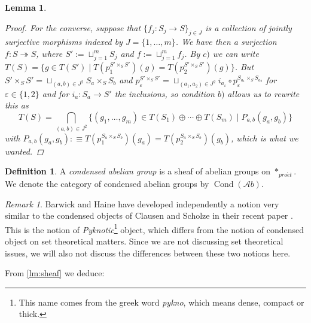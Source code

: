 \documentclass[11pt,A4]{article}
\theoremstyle{plain}
\newtheorem{lm}[thm]{Lemma}
\theoremstyle{definition}
\newtheorem{defn}[thm]{Definition}
\theoremstyle{remark}
\newtheorem{rem}[thm]{Remark}
\newcommand{\1}{\mathbbm{1}}
\newcommand{\Ab}{\mathscr{A}b}
\DeclareMathOperator{\Cond}{Cond}
\newcommand{\pe}{*_{pro\acute et}}
\newcommand{\op}{\oplus}
\newcommand{\fp}[1]{\times_{#1}}
\begin{document}
\begin{lm}
\begin{proof}
	For the converse, suppose that $\{f_{j}\colon S_{j}\to S\}_{j\in J}$ is a collection of jointly surjective morphisms indexed by $J=\{ 1,\ldots,m\}$.
	We have then a surjection $f\colon S \twoheadrightarrow S$, where $S':=\sqcup_{j=1}^{m}S_{j}$ and $f:=\sqcup_{j=1}^{m}f_{j}$.
	By $c)$ we can write $T(S)=\{ g\in T(S')\mid T(p_{1}^{S'\fp{S}S'})(g)=T(p_{2}^{S'\fp{S}S'})(g)\}$.
	But $S'\fp{S}S'=\sqcup_{(a,b)\in J^{2}} S_{a}\fp{S}S_{b}$ and $p_{\varepsilon }^{S'\fp{S}S'}=\sqcup_{(a_{1},a_{2})\in J^{2}} i_{a_{\varepsilon}}\circ p_{\varepsilon }^{S_{a_{1}}\fp{S}S_{a_{2}}}$ for $\varepsilon \in \{1,2\}$ and for $i_{a}\colon S_{a}\to S'$ the inclusions, so condition $b)$ allows us to rewrite this as
	\[ T(S)=\bigcap_{(a,b)\in J^{2}} \{ (g_{1},\ldots,g_{m})\in T(S_{1})\op \cdots \op T(S_{m})\mid P_{a,b}(g_{a},g_{b})\}\]
	with $P_{a,b}(g_{a},g_{b}):\equiv T(p_{1}^{S_{a}\fp{S}S_{b}})(g_{a})=T(p_{2}^{S_{a}\fp{S}S_{b}})(g_{b})$, which is what we wanted.	
    \end{proof}
\end{lm}

\begin{defn}
    A \textit{condensed abelian group} is a sheaf of abelian groups on $\pe$.
    We denote the category of condensed abelian groups by $\Cond(\Ab)$.
\end{defn}

\begin{rem}
    Barwick and Haine have developed independently a notion very similar to the condensed objects of Clausen and Scholze in their recent paper \cite{bh19}.
    This is the notion of \textit{Pyknotic}\footnote{This name comes from the greek word \textit{pykno}, which means dense, compact or thick.} object, which differs from the notion of condensed object on set theoretical matters.
    Since we are not discussing set theoretical issues, we will also not discuss the differences between these two notions here.
\end{rem}

From \cref{lm:sheaf} we deduce:
\end{document}
